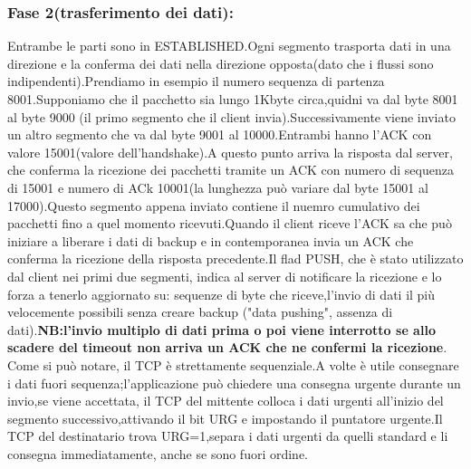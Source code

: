 \subsubsection{Fase 2(trasferimento dei dati):}
Entrambe le parti sono in ESTABLISHED.Ogni segmento trasporta dati in una direzione e la conferma dei dati nella direzione opposta(dato che i flussi sono indipendenti).Prendiamo in esempio il numero sequenza di partenza 8001.Supponiamo che il pacchetto sia lungo 1Kbyte circa,quidni va dal byte 8001 al byte 9000 (il primo segmento che il client invia).Successivamente viene inviato un altro segmento che va dal byte 9001 al 10000.Entrambi hanno l'ACK con valore 15001(valore dell'handshake).A questo punto arriva la risposta dal server, che conferma la ricezione dei pacchetti tramite un ACK con numero di sequenza di 15001 e numero di ACk 10001(la lunghezza può variare dal byte 15001 al 17000).Questo segmento appena inviato contiene il nuemro cumulativo dei pacchetti fino a quel momento ricevuti.Quando il client riceve l'ACK sa che può iniziare a liberare i dati di backup e in contemporanea invia un ACK che conferma la ricezione della risposta precedente.Il flad PUSH, che è stato utilizzato dal client nei primi due segmenti, indica al server di notificare la ricezione e lo forza a tenerlo aggiornato su: sequenze di byte che riceve,l'invio di dati il più velocemente possibili senza creare backup ("data pushing", assenza di dati).\textbf{NB:l'invio multiplo di dati prima o poi viene interrotto se allo scadere del timeout non arriva un ACK che ne confermi la ricezione}. \\
Come si può notare, il TCP è strettamente sequenziale.A volte è utile consegnare i dati fuori sequenza;l'applicazione può chiedere una consegna urgente durante un invio,se viene accettata, il TCP del mittente colloca i dati urgenti all'inizio del segmento successivo,attivando il bit URG e impostando il puntatore urgente.Il TCP del destinatario trova URG=1,separa i dati urgenti da quelli standard e li consegna immediatamente, anche se sono fuori ordine.
